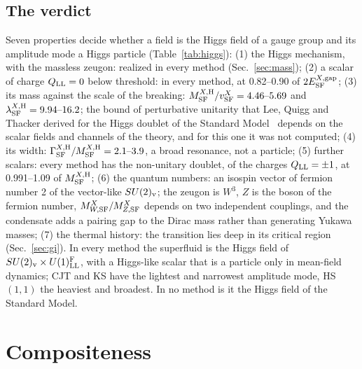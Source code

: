 \documentclass[aps,prd,onecolumn,superscriptaddress,nofootinbib,floatfix,longbibliography]{revtex4-2}
\newcommand{\LL}{{\rm LL}}
\newcommand{\SF}{{\rm SF}}
\begin{document}
\subsection{The verdict}

Seven properties decide whether a field is the Higgs field of a gauge group and its amplitude mode a Higgs particle
(Table~\ref{tab:higgs}):
(1) the Higgs mechanism, with the massless zeugon: realized in every method (Sec.~\ref{sec:mass});
(2) a scalar of charge $Q_\LL=0$ below threshold: in every method, at 0.82\mbox{--}0.90 of $2E^{X,{\rm gap}}_\SF$;
(3) its mass against the scale of the breaking: $M^{X,{\rm H}}_\SF/v^X_\SF=4.46\mbox{--}5.69$ and $\lambda^{X,{\rm H}}_\SF=9.94\mbox{--}16.2$; the
bound of perturbative unitarity that Lee, Quigg and Thacker derived for the Higgs doublet of the Standard Model~\cite{LQT1977}
depends on the scalar fields and channels of the theory, and for this one it was not computed;
(4) its width: $\Gamma^{X,{\rm H}}_\SF/M^{X,{\rm H}}_\SF=2.1\mbox{--}3.9$, a broad resonance, not a particle;
(5) further scalars: every method has the non-unitary doublet, of the charges $Q_\LL=\pm1$, at 0.991\mbox{--}1.09 of $M^{X,{\rm H}}_\SF$;
(6) the quantum numbers: an isospin vector of fermion number 2 of the vector-like $SU(2)_{\rm v}$; the zeugon is $W^3$, $Z$ is the
boson of the fermion number, $M^X_{W,\SF}/M^X_{Z,\SF}$ depends on two independent couplings, and the condensate adds a pairing gap to
the Dirac mass rather than generating Yukawa masses;
(7) the thermal history: the transition lies deep in its critical region (Sec.~\ref{sec:gi}).
In every method the superfluid is the Higgs field of $SU(2)_{\rm v}\times U(1)^{\rm F}_\LL$, with a Higgs-like scalar that is a particle
only in mean-field dynamics; CJT and KS have the lightest and narrowest amplitude mode, HS $(1,1)$ the heaviest and broadest. In
no method is it the Higgs field of the Standard Model.

\section{Compositeness}
\label{sec:composite}
\end{document}

